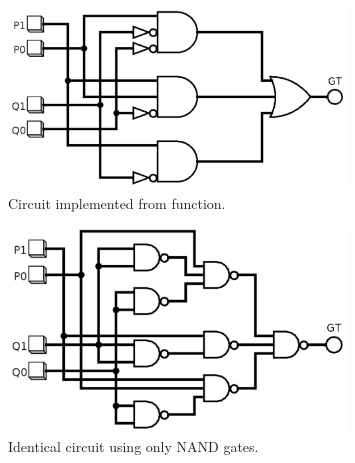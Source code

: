 \documentclass{article}
\begin{document}
\begin{figure}[hbtp]
  \centering
  \includegraphics[width=0.8\textwidth]{circuit}
  \caption{\label{fig:circuit} Circuit implemented from function.}
\end{figure}

\begin{figure}[hbtp]
  \centering
  \includegraphics[width=0.8\textwidth]{circuit_nand}
  \caption{\label{fig:circuit_nand} Identical circuit using only NAND gates.}
\end{figure}
\end{document}
